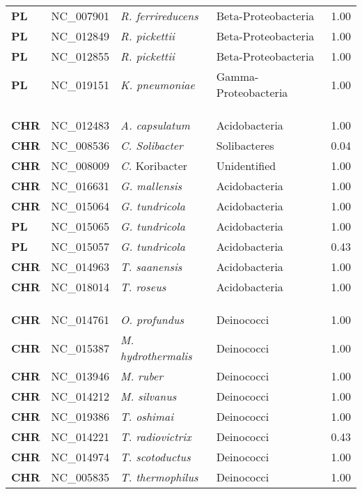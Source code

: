 \begin{adjustwidth}{-3cm}{2cm}
{\begin{supertabular}{>{\bfseries}l|p{0.1\textwidth}p{0.14\textwidth}l|l}
PL & NC\_007901 & \textit{R. ferrireducens} & Beta-Proteobacteria & 1.00\\
PL & NC\_012849 & \textit{R. pickettii} & Beta-Proteobacteria & 1.00\\
PL & NC\_012855 & \textit{R. pickettii} & Beta-Proteobacteria & 1.00\\
PL & NC\_019151 & \textit{K. pneumoniae} & Gamma-Proteobacteria & 1.00\\
\\
\\
\hline\\
CHR & NC\_012483 & \textit{A. capsulatum} & Acidobacteria & 1.00\\
CHR & NC\_008536 & \textit{C. Solibacter} & Solibacteres & 0.04\\
CHR & NC\_008009 & \textit{C.} Koribacter & Unidentified & 1.00\\
CHR & NC\_016631 & \textit{G. mallensis} & Acidobacteria & 1.00\\
CHR & NC\_015064 & \textit{G. tundricola} & Acidobacteria & 1.00\\
PL & NC\_015065 & \textit{G. tundricola} & Acidobacteria & 1.00\\
PL & NC\_015057 & \textit{G. tundricola} & Acidobacteria & 0.43\\
CHR & NC\_014963 & \textit{T. saanensis} & Acidobacteria & 1.00\\
CHR & NC\_018014 & \textit{T. roseus} & Acidobacteria & 1.00\\
\\
\\
\hline\\
CHR & NC\_014761 & \textit{O. profundus} & Deinococci & 1.00\\
CHR & NC\_015387 & \textit{M. hydrothermalis} & Deinococci & 1.00\\
CHR & NC\_013946 & \textit{M. ruber} & Deinococci & 1.00\\
CHR & NC\_014212 & \textit{M. silvanus} & Deinococci & 1.00\\
CHR & NC\_019386 & \textit{T. oshimai} & Deinococci & 1.00\\
CHR & NC\_014221 & \textit{T. radiovictrix} & Deinococci & 0.43\\
CHR & NC\_014974 & \textit{T. scotoductus} & Deinococci & 1.00\\
CHR & NC\_005835 & \textit{T. thermophilus} & Deinococci & 1.00\\

\end{supertabular}}
\end{adjustwidth}
